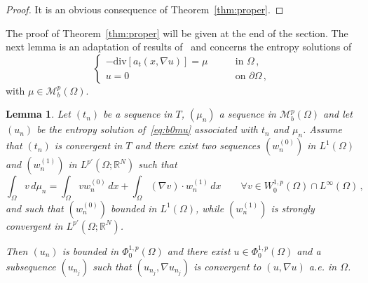 \documentclass[twoside,reqno]{amsart}
\numberwithin{equation}{section}
\newtheorem{lem}[thm]{Lemma}
\theoremstyle{definition}
\newcommand{\R}{\mathbb{R}}
\begin{document}
%
\begin{proof}
It is an obvious consequence of Theorem~\ref{thm:proper}.
\end{proof}
%
The proof of Theorem~\ref{thm:proper} will be given at the end of 
the section.
The next lemma is an adaptation of results 
of~\cite{benilan_boccardo_gallouet_gariepy_pierre_vazquez1995,
boccardo_gallouet_orsina1996, malusa_prignet2004} 
and concerns the entropy solutions of
\begin{equation}
\label{eq:b0mu}
\begin{cases}
- \mathrm{div}[a_t(x,\nabla u)] = \mu 
&\qquad\text{in $\Omega$}\,,\\
u=0
&\qquad\text{on $\partial\Omega$}\,,
\end{cases}
\end{equation}
with $\mu\in\mathcal{M}_b^p(\Omega)$.
%
\begin{lem}
\label{lem:comp}
Let $(t_n)$ be a sequence in $T$, $(\mu_n)$ a sequence in 
$\mathcal{M}_b^p(\Omega)$ and let $(u_n)$ be the entropy 
solution of~\eqref{eq:b0mu} associated with $t_n$ and $\mu_n$.
Assume that $(t_n)$ is convergent in $T$ and there exist
two sequences $(w_n^{(0)})$ in $L^1(\Omega)$ and $(w_n^{(1)})$ 
in $L^{p'}(\Omega;\R^N)$ such that
\[
\int_\Omega v\,d\mu_n 
= \int_\Omega v w_n^{(0)}\,dx 
+\int_\Omega (\nabla v)\cdot w_n^{(1)}\,dx
\qquad\forall v\in W^{1,p}_0(\Omega)\cap L^\infty(\Omega)\,,
\]
and such that $(w_n^{(0)})$ bounded in $L^1(\Omega)$, 
while $(w_n^{(1)})$ is strongly convergent in $L^{p'}(\Omega;\R^N)$.
\par
Then $(u_n)$ is bounded in $\Phi^{1,p}_0(\Omega)$ and
there exist $u\in \Phi^{1,p}_0(\Omega)$ and a subsequence 
$(u_{n_j})$ such that $(u_{n_j},\nabla u_{n_j})$ is convergent 
to $(u,\nabla u)$ a.e. in $\Omega$.
\end{lem}
%
\end{document}
